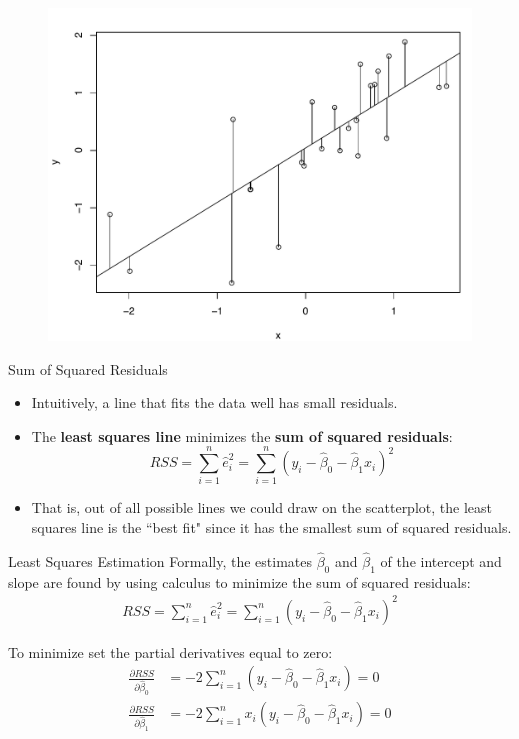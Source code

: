 \documentclass[10pt]{beamer}
\begin{document}
\begin{frame}
\begin{figure}
\includegraphics[scale=0.5]{figure/scatter4_2.pdf}
\end{figure}
\end{frame}

\begin{frame}{Sum of Squared Residuals}
\begin{itemize}
\item Intuitively, a line that fits the data well has small residuals.
\vspace{5pt}
\item The \textbf{least squares line} minimizes the \textbf{sum of squared residuals}:
$$RSS = \sum_{i=1}^n \hat{e}_i^2 = \sum_{i=1}^n (y_i - \hat{\beta}_0 - \hat{\beta}_1 x_i)^2$$
\vspace{5pt}
\item That is, out of all possible lines we could draw on the scatterplot, the least squares line is the ``best fit" since it has the smallest sum of squared residuals.
\end{itemize}
\end{frame}

\begin{frame}{Least Squares Estimation}
Formally, the estimates $\hat{\beta}_0$ and $\hat{\beta}_1$ of the intercept and slope are found by using calculus to minimize the sum of squared residuals:
\begin{align*}
RSS = \sum_{i=1}^n \hat{e}_i^2 = \sum_{i=1}^n (y_i - \hat{\beta}_0 - \hat{\beta}_1 x_i)^2
\end{align*}

To minimize set the partial derivatives equal to zero:\\
\begin{align*}
\frac{\partial RSS}{\partial \hat{\beta}_0} &= -2 \sum_{i=1}^n (y_i - \hat{\beta}_0 - \hat{\beta}_1 x_i) = 0\\
\frac{\partial RSS}{\partial \hat{\beta}_1} &= -2 \sum_{i=1}^n x_i (y_i - \hat{\beta}_0 - \hat{\beta}_1 x_i) = 0
\end{align*}
\end{frame}
\end{document}
